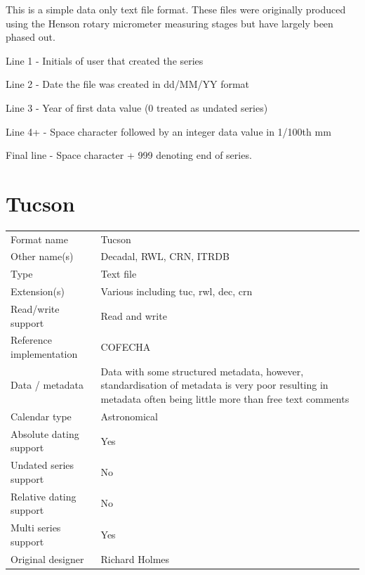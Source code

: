 \documentclass[10pt, headsepline,DIV14,BCOR0.5cm]{scrreprt}
\begin{document}
This is a simple data only text file format. These files were originally produced using the Henson rotary micrometer measuring stages but have largely been phased out. 

\begin{itemize*}
 \item Line 1 - Initials of user that created the series
 \item Line 2 - Date the file was created in dd/MM/YY format
 \item Line 3 - Year of first data value (0 treated as undated series)
 \item Line 4+ - Space character followed by an integer data value in 1/100th mm
 \item Final line - Space character + 999 denoting end of series. 
\end{itemize*}


\chapter{Tucson}

\begin{table}[htbp]
\label{summary:tucson}
\begin{center}
\begin{tabular*}{15cm}{ l @{\extracolsep{\fill}} p{9cm} }
  \toprule

Format name     	 & Tucson\\
Other name(s)      	 & Decadal, RWL, CRN, ITRDB\\
Type      	 	 & Text file\\
Extension(s)      	 & Various including tuc, rwl, dec, crn\\
Read/write support     	 & Read and write\\
Reference implementation & COFECHA\\
Data / metadata      	 & Data with some structured metadata, however, standardisation of metadata is very poor resulting in metadata often being little more than free text comments\\
Calendar type		 & Astronomical\\
Absolute dating support	 & Yes\\
Undated series support   & No\\
Relative dating support  & No\\
Multi series support	 & Yes\\
Original designer	 & Richard Holmes\\

\bottomrule
\end{tabular*}
\end{center}
\end{table}
\end{document}
